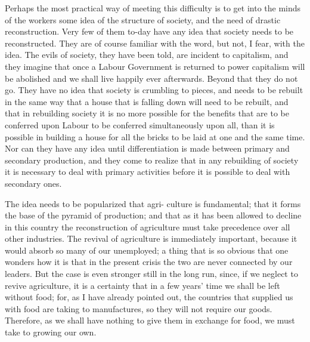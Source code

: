 \documentclass{book}
\begin{document}
Perhaps the most practical way of meeting this difficulty is to get into the minds of the workers some idea of the structure of society, and the need of drastic reconstruction. Very few of them to-day have any idea that society needs to be reconstructed. They are of course familiar with the word, but not, I fear, with the idea. The evils of society, they have been told, are incident to capitalism, and they imagine that once a Labour Government is returned to power capitalism will be abolished and we shall live happily ever afterwards. Beyond that they do not go. They have no idea that society is crumbling to pieces, and needs to be rebuilt in the same way that a house that is falling down will need to be rebuilt, and that in rebuilding society it is no more possible for the benefits that are to be conferred upon Labour to be conferred simultaneously upon all, than it is possible in building a house for all the bricks to be laid at one and the same time. Nor can they have any idea until differentiation is made between primary and secondary production, and they come to realize that in any rebuilding of society it is necessary to deal with primary activities before it is possible to deal with secondary ones.

The idea needs to be popularized that agri- culture is fundamental; that it forms the base of the pyramid of production; and that as it has been allowed to decline in this country the reconstruction of agriculture must take precedence over all other industries. The revival of agriculture is immediately important, because it would absorb so many of our unemployed; a thing that is so obvious that one wonders how it is that in the present crisis the two are never connected by our leaders. But the case is even stronger still in the long run, since, if we neglect to revive agriculture, it is a certainty that in a few years’ time we shall be left without food; for, as I have already pointed out, the countries that supplied us with food are taking to manufactures, so they will not require our goods. Therefore, as we shall have nothing to give them in exchange for food, we must take to growing our own.
\end{document}
